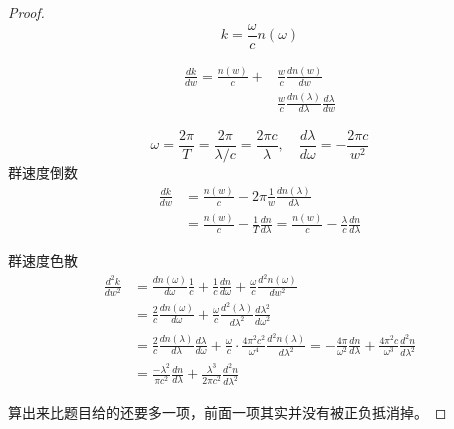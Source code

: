 \begin{proof}
$$
k=\frac{\omega}{c} n(\omega)
$$


$$
\begin{aligned} \frac{d k}{d w}=\frac{n(w)}{c}+& \frac{w}{c} \frac{d n(w)}{d w} \\ & \frac{w}{c} \frac{d n(\lambda)}{d \lambda} \frac{d \lambda}{d w} \end{aligned}
$$

$$
\omega=\frac{2 \pi}{T}=\frac{2 \pi}{\lambda / c}=\frac{2 \pi c}{\lambda},\quad \frac{d \lambda}{d \omega}=-\frac{2 \pi c}{w^{2}}
$$
群速度倒数
\begin{equation}
\begin{aligned} \frac{d k}{d w} &=\frac{n(w)}{c}-2 \pi \frac{1}{w} \frac{d n(\lambda)}{d \lambda} \\ &=\frac{n(w)}{c}-\frac{1}{T} \frac{d n}{d \lambda}=\frac{n(w)}{c}-\frac{\lambda}{c} \frac{d n}{d \lambda} \end{aligned}
\end{equation}

群速度色散
\begin{equation}
\begin{aligned} \frac{d^{2} k}{d w^{2}} &=\frac{d n(\omega)}{d \omega} \frac{1}{c}+\frac{1}{c} \frac{d n}{d \omega}+\frac{\omega}{c} \frac{d^{2} n(\omega)}{d w^{2}} \\ &=\frac{2}{c} \frac{d n(\omega)}{d \omega}+\frac{\omega}{c} \frac{d^{2}(\lambda)}{d \lambda^{2}} \frac{d \lambda^{2}}{d \omega^2} \\ &=\frac{2}{c} \frac{d n(\lambda)}{d \lambda} \frac{d \lambda}{d \omega}+\frac{\omega}{c} \cdot \frac{4 \pi^{2} c^{2}}{\omega^{4}} \frac{d^{2} n(\lambda)}{d \lambda^{2}}=-\frac{4 \pi}{\omega^2} \frac{d n}{d \lambda}+\frac{4 \pi^{2} c}{\omega^{3}} \frac{d^{2} n}{d \lambda^{2}}\\ &=\frac{- \lambda^2}{\pi c^2} \frac{d n}{d \lambda}+\frac{\lambda^3}{2\pi c^2} \frac{d^{2} n}{d \lambda^{2}} \end{aligned}
\end{equation}

算出来比题目给的还要多一项，前面一项其实并没有被正负抵消掉。
\end{proof}
